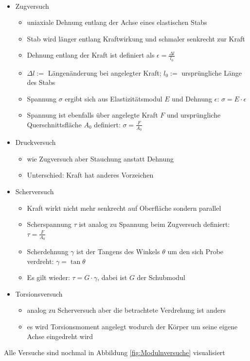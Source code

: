 \documentclass[11pt,a4paper]{article}
\numberwithin{equation}{section}
\numberwithin{figure}{section}
\begin{document}
\\
\begin{addmargin}[25pt]{0pt}
\begin{itemize}
    \item Zugversuch
    \begin{itemize}
        \item uniaxiale Dehnung entlang der Achse eines elastischen Stabs
        \item Stab wird länger entlang Kraftwirkung und schmaler senkrecht zur Kraft
        \item Dehnung entlang der Kraft ist definiert als $\epsilon = \frac{\Delta l}{l_0}$
        \item $\Delta l :=$ Längenänderung bei angelegter Kraft; $l_0 :=$ ursprüngliche Länge des Stabs
        \item Spannung $\sigma$ ergibt sich aus Elastizitätsmodul $E$ und Dehnung $\epsilon$: $\sigma = E\cdot\epsilon$ 
        \item Spannung ist ebenfalls über angelegte Kraft $F$ und ursprüngliche Querschnittsfläche $A_0$ definiert: $\sigma = \frac{F}{A_0}$
    \end{itemize}
    \item Druckversuch
    \begin{itemize}
        \item wie Zugversuch aber Stauchung anstatt Dehnung 
        \item Unterschied: Kraft hat anderes Vorzeichen
    \end{itemize}
    \item Scherversuch
    \begin{itemize}
        \item Kraft wirkt nicht mehr senkrecht auf Oberfläche sondern parallel
        \item Scherspannung $\tau$ ist analog zu Spannung beim Zugversuch definiert: $\tau = \frac{F}{A_0}$
        \item Scherdehnung $\gamma$ ist der Tangens des Winkels $\theta$ um den sich Probe verdreht: $\gamma = \tan\theta$
        \item Es gilt wieder: $\tau = G\cdot\gamma$, dabei ist $G$ der Schubmodul
    \end{itemize}
    \item Torsionsversuch
    \begin{itemize}
        \item analog zu Scherversuch aber die betrachtete Verdrehung ist anders
        \item es wird Torsionsmoment angelegt wodurch der Körper um seine eigene Achse eingedreht wird
    \end{itemize}
\end{itemize}
Alle Versuche sind nochmal in Abbildung \ref{fig:Modulnversuche} visualisiert


\end{addmargin}
\end{document}
